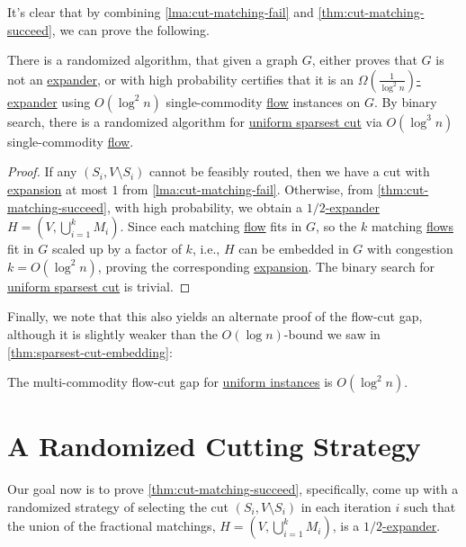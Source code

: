 It's clear that by combining \autoref{lma:cut-matching-fail} and \autoref{thm:cut-matching-succeed}, we can prove the following.

\begin{corollary}\label{col:cut-matching-sparsest-cut}
	There is a randomized algorithm, that given a graph \(G\), either proves that \(G\) is not an \hyperref[def:expander]{expander}, or with high probability certifies that it is an \hyperref[def:expander]{\(\Omega (\frac{1}{\log ^2 n})\)-expander} using \(O(\log ^2 n)\) single-commodity \hyperref[def:flow]{flow} instances on \(G\). By binary search, there is a randomized algorithm for \hyperref[prb:sparsest-cut]{uniform sparsest cut} via \(O(\log ^3 n)\) single-commodity \hyperref[def:flow]{flow}.
\end{corollary}
\begin{proof}
	If any \((S_i, V\setminus S_i)\) cannot be feasibly routed, then we have a cut with \hyperref[def:expansion]{expansion} at most \(1\) from \autoref{lma:cut-matching-fail}. Otherwise, from \autoref{thm:cut-matching-succeed}, with high probability, we obtain a \hyperref[def:expander]{\(1 / 2\)-expander} \(H = (V, \bigcup_{i=1}^{k} M_i)\). Since each matching \hyperref[def:flow]{flow} fits in \(G\), so the \(k\) matching \hyperref[def:flow]{flows} fit in \(G\) scaled up by a factor of \(k\), i.e., \(H\) can be embedded in \(G\) with congestion \(k = O(\log ^2 n)\), proving the corresponding \hyperref[def:expansion]{expansion}. The binary search for \hyperref[prb:sparsest-cut]{uniform sparsest cut} is trivial.
\end{proof}

Finally, we note that this also yields an alternate proof of the flow-cut gap, although it is slightly weaker than the \(O(\log n)\)-bound we saw in \autoref{thm:sparsest-cut-embedding}:

\begin{corollary}
	The multi-commodity flow-cut gap for \hyperref[prb:sparsest-cut]{uniform instances} is \(O(\log ^2 n)\).
\end{corollary}

\section{A Randomized Cutting Strategy}
Our goal now is to prove \autoref{thm:cut-matching-succeed}, specifically, come up with a randomized strategy of selecting the cut \((S_i, V\setminus S_i)\) in each iteration \(i\) such that the union of the fractional matchings, \(H = (V, \bigcup_{i=1}^{k} M_i)\), is a \hyperref[def:expander]{\(1 / 2\)-expander}.

